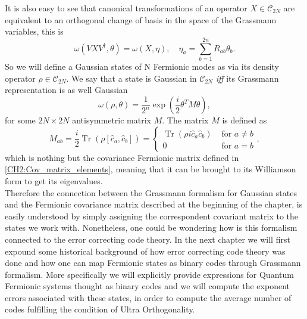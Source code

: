 \indent It is also easy to see that canonical transformations of an operator $X\in\mathcal{C}_{2N}$ are equivalent to an orthogonal change of basis in the space of the Grassmann variables, this is
\begin{equation}
\omega\left(V X V^{\dagger}, \theta\right)=\omega(X, \eta), \quad \eta_{a}=\sum_{b=1}^{2 n} R_{a b} \theta_{b}.
\label{CH2:Transformations_in_Grassmann_Variables}
\end{equation}
\indent So we will define  a Gaussian states of N Fermionic modes as via its density operator $\rho\in\mathcal{C}_{2N}$. We say that a state is Gaussian in  $\mathcal{C}_{2N}$ \textit{iff} its Grassmann representation is as well Gaussian
\begin{equation}
\omega(\rho, \theta)=\frac{1}{2^{n}} \exp \left(\frac{i}{2} \theta^{T} M \theta\right),
\end{equation}
for some $2N\times 2N$ antisymmetric matrix $M$. The matrix $M$ is defined as 
\begin{equation}
M_{a b}=\frac{i}{2} \operatorname{Tr}\left(\rho\left[\hat{c}_{a}, \hat{c}_{b}\right]\right)=\left\{\begin{aligned}
\operatorname{Tr}\left(\rho i \hat{c}_{a} \hat{c}_{b}\right) & \text { for } a \neq b \\
0 & \text { for } a=b
\end{aligned}\right. ,
\end{equation}
which is nothing but the covariance Fermionic matrix defined in \eqref{CH2:Cov_matrix_elements}, meaning that it can be brought to its Williamson form to get its eigenvalues.\\
\indent Therefore the connection between the Grassmann formalism for Gaussian states and the Fermionic covariance matrix described at the beginning of the chapter, is easily understood by simply assigning the correspondent covariant matrix to the states we work with. Nonetheless, one could be wondering how is this formalism connected to the error correcting code theory. In the next chapter we will first expound some historical background of how error correcting code theory was done and how one can map Fermionic states as binary codes through Grassmann formalism. More specifically we will explicitly provide expressions for Quantum Fermionic systems thought as binary codes and we will compute the exponent errors associated with these states, in order to compute the average number of codes fulfilling the condition of Ultra Orthogonality.

